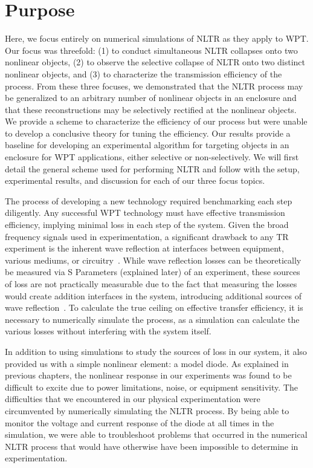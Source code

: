 \section{Purpose}
\label{sec:numerical-purpose}

Here, we focus entirely on numerical simulations of NLTR as they apply to WPT. Our focus was threefold: (1) to conduct simultaneous NLTR collapses onto two nonlinear objects, (2) to observe the selective collapse of NLTR onto two distinct nonlinear objects, and (3) to characterize the transmission efficiency of the process. From these three focuses, we demonstrated that the NLTR process may be generalized to an arbitrary number of nonlinear objects in an enclosure and that these reconstructions may be selectively rectified at the nonlinear objects. We provide a scheme to characterize the efficiency of our process but were unable to develop a conclusive theory for tuning the efficiency. Our results provide a baseline for developing an experimental algorithm for targeting objects in an enclosure for WPT applications, either selective or non-selectively.  We will first detail the general scheme used for performing NLTR and follow with the setup, experimental results, and discussion for each of our three focus topics.

The process of developing a new technology required benchmarking each step diligently. Any successful WPT technology must have effective transmission efficiency, implying minimal loss in each step of the system. Given the broad frequency signals used in experimentation, a significant drawback to any TR experiment is the inherent wave reflection at interfaces between equipment, various mediums, or circuitry~\cite{smith_waves_2010,griffiths_david_introduction_1999}. While wave reflection losses can be theoretically be measured via S Parameters (explained later) of an experiment, these sources of loss are not practically measurable due to the fact that measuring the losses would create addition interfaces in the system, introducing additional sources of wave reflection~\cite{smith_waves_2010}. To calculate the true ceiling on effective transfer efficiency, it is necessary to numerically simulate the process, as a simulation can calculate the various losses without interfering with the system itself.

In addition to using simulations to study the sources of loss in our system, it also provided us with a simple nonlinear element: a model diode. As explained in previous chapters, the nonlinear response in our \giga experiments was found to be difficult to excite due to power limitations, noise, or equipment sensitivity. The difficulties that we encountered in our physical experimentation were circumvented by numerically simulating the NLTR process. By being able to monitor the voltage and current response of the diode at all times in the simulation, we were able to troubleshoot problems that occurred in the numerical NLTR process that would have otherwise have been impossible to determine in experimentation.

